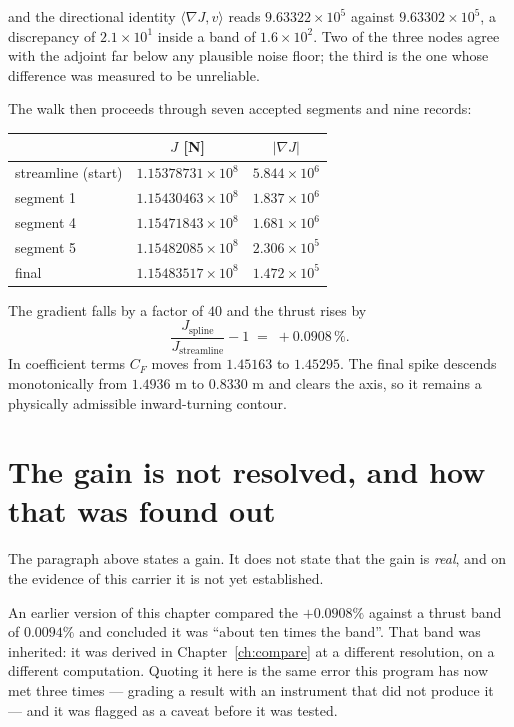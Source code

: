 \noindent and the directional identity $\langle \nabla J, v\rangle$
reads $9.63322\times10^{5}$ against $9.63302\times10^{5}$, a
discrepancy of $2.1\times10^{1}$ inside a band of
$1.6\times10^{2}$. Two of the three nodes agree with the adjoint far
below any plausible noise floor; the third is the one whose
difference was measured to be unreliable.

The walk then proceeds through seven accepted segments and nine
records:

\begin{center}
\begin{tabular}{lcc}
\toprule
 & $J$ [N] & $|\nabla J|$ \\
\midrule
streamline (start) & $1.15378731\times10^{8}$ & $5.844\times10^{6}$ \\
segment 1          & $1.15430463\times10^{8}$ & $1.837\times10^{6}$ \\
segment 4          & $1.15471843\times10^{8}$ & $1.681\times10^{6}$ \\
segment 5          & $1.15482085\times10^{8}$ & $2.306\times10^{5}$ \\
final              & $1.15483517\times10^{8}$ & $1.472\times10^{5}$ \\
\bottomrule
\end{tabular}
\end{center}

The gradient falls by a factor of $40$ and the thrust rises by
\begin{equation}
  \frac{J_{\text{spline}}}{J_{\text{streamline}}} - 1
  \;=\; +0.0908\,\%.
\end{equation}
In coefficient terms $C_F$ moves from $1.45163$ to $1.45295$. The
final spike descends monotonically from $1.4936$ m to $0.8330$ m and
clears the axis, so it remains a physically admissible inward-turning
contour.

\section{The gain is not resolved, and how that was found out}
\label{sec:notresolved}

The paragraph above states a gain. It does not state that the gain is
\emph{real}, and on the evidence of this carrier it is not yet
established.

An earlier version of this chapter compared the $+0.0908\%$ against a
thrust band of $0.0094\%$ and concluded it was ``about ten times the
band''. That band was inherited: it was derived in
Chapter~\ref{ch:compare} at a different resolution, on a different
computation. Quoting it here is the same error this program has now
met three times --- grading a result with an instrument that did not
produce it --- and it was flagged as a caveat before it was tested.

